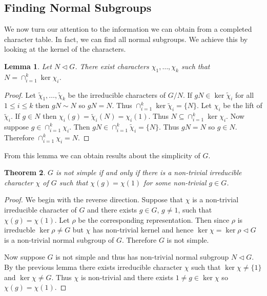 \documentclass[11pt, notitlepage]{article}
\numberwithin{equation}{section}
\theoremstyle{plain}
\newtheorem{theorem}{Theorem}[section]
\newtheorem{lemma}[theorem]{Lemma}
\theoremstyle{definition}
\begin{document}
\subsection{Finding Normal Subgroups}

We now turn our attention to the information we can obtain from a completed character table. In fact, we can find all normal subgroups. We achieve this by looking at the kernel of the characters.

\begin{lemma}
	Let $N\triangleleft G$. There exist characters $\chi_1,\ldots,\chi_k$ such that $N = \cap_{i=1}^k \ker \chi_i$.
\end{lemma}

\begin{proof}
	Let $\tilde\chi_1,\ldots,\tilde\chi_k$ be the irreducible characters of $G/N$. If $gN\in\ker\tilde\chi_i$ for all $1\leq i\leq k$ then $gN\sim N$ so $gN = N$. Thus $\cap_{i=1}^k \ker\tilde\chi_i = \{N\}$. Let $\chi_i$ be the lift of $\tilde\chi_i$. If $g\in N$ then $\chi_i(g) = \tilde\chi_i(N) = \chi_i(1)$. Thus $N \subseteq \cap_{i=1}^k\ker\chi_i$. Now suppose $g\in\cap_{i=1}^k\chi_i$. Then $gN\in\cap_{i=1}^k\tilde\chi_i = \{N\}$. Thus $gN=N$ so $g\in N$. Therefore $\cap_{i=1}^k\chi_i = N$.
\end{proof}

From this lemma we can obtain results about the simplicity of $G$.

\begin{theorem}
	$G$ is not simple if and only if there is a non-trivial irreducible character $\chi$ of $G$ such that $\chi(g) = \chi(1)$ for some non-trivial $g\in G$.
\end{theorem}

\begin{proof}
We begin with the reverse direction. Suppose that $\chi$ is a non-trivial irreducible character of $G$ and there exists $g\in G$, $g\neq 1$, such that $\chi(g) = \chi(1)$. Let $\rho$ be the corresponding representation. Then since $\rho$ is irreducble $\ker\rho \neq G$ but $\chi$ has non-trivial kernel and hence $\ker\chi = \ker\rho \triangleleft G$ is a non-trivial normal subgroup of $G$. Therefore $G$ is not simple.

Now suppose $G$ is not simple and thus has non-trivial normal subgroup $N\triangleleft G$. By the previous lemma there exists irreducible character $\chi$ such that $\ker\chi \neq \{1\}$ and $\ker\chi\neq G$. Thus $\chi$ is non-trivial and there exists $1\neq g\in\ker\chi$ so $\chi(g) = \chi(1)$.
\end{proof}
\end{document}
